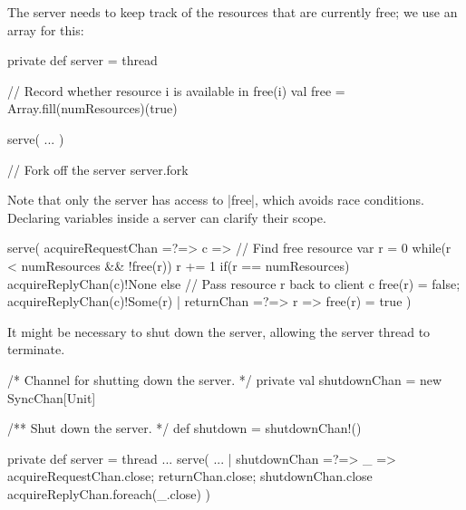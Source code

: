 
\begin{slide}

The server needs to keep track of the resources that are currently free; we
use an array  for this:
%
\begin{scala}
  private def server = thread{
    // Record whether resource i is available in free(i)
    val free = Array.fill(numResources)(true)

    serve( 
      ...
    )
  }

  // Fork off the server
  server.fork
\end{scala}
%
Note that only the server has access to |free|, which avoids race
conditions.  Declaring variables inside a server can clarify their scope. 
\end{slide}


\begin{slide}

\begin{scala}
    serve(
      acquireRequestChan =?=> { c => 
	// Find free resource
	var r = 0
	while(r < numResources && !free(r)) r += 1
	if(r == numResources) acquireReplyChan(c)!None
        else{  // Pass resource r back to client c
	  free(r) = false; acquireReplyChan(c)!Some(r)
        }
      }
      | returnChan =?=> { r => free(r) = true }
    )
\end{scala}
\end{slide}





\begin{slide}

It might be necessary to shut down the server, allowing the server thread to
terminate. 
%
\begin{scala}
  /* Channel for shutting down the server. */
  private val shutdownChan = new SyncChan[Unit]

  /** Shut down the server. */
  def shutdown = shutdownChan!()
  
  private def server = thread{
    ...
    serve(
      ...
      | shutdownChan =?=> { _ =>
          acquireRequestChan.close; returnChan.close; shutdownChan.close
          acquireReplyChan.foreach(_.close) }
    )
  }
\end{scala}  
\end{slide}
